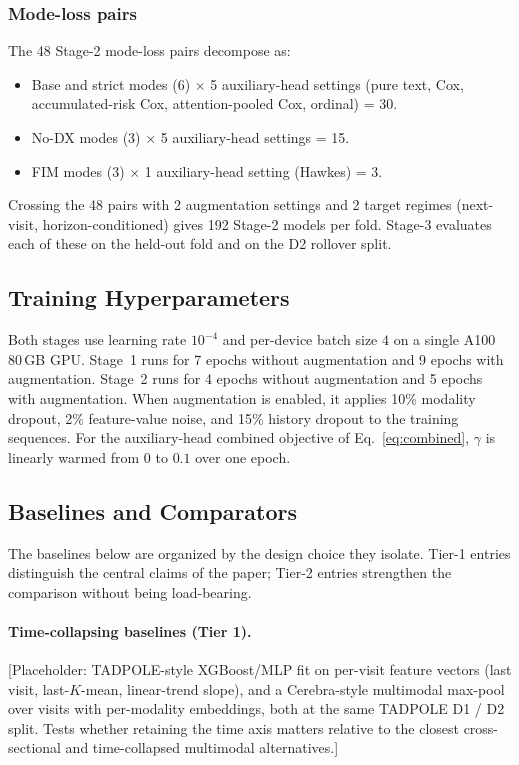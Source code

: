 \documentclass{article}
\begin{document}
\subsubsection{Mode-loss pairs}

The 48 Stage-2 mode-loss pairs decompose as:
\begin{itemize}[leftmargin=*,itemsep=2pt,topsep=2pt]
    \item Base and strict modes (6) $\times$ 5 auxiliary-head settings (pure text, Cox, accumulated-risk Cox, attention-pooled Cox, ordinal) = 30.
    \item No-DX modes (3) $\times$ 5 auxiliary-head settings = 15.
    \item FIM modes (3) $\times$ 1 auxiliary-head setting (Hawkes) = 3.
\end{itemize}
Crossing the 48 pairs with 2 augmentation settings and 2 target regimes (next-visit, horizon-conditioned) gives 192 Stage-2 models per fold. Stage-3 evaluates each of these on the held-out fold and on the D2 rollover split.

\subsection{Training Hyperparameters}
\label{app:hparams}

Both stages use learning rate $10^{-4}$ and per-device batch size $4$ on a single A100 80\,GB GPU. Stage~1 runs for 7 epochs without augmentation and 9 epochs with augmentation. Stage~2 runs for 4 epochs without augmentation and 5 epochs with augmentation. When augmentation is enabled, it applies 10\% modality dropout, 2\% feature-value noise, and 15\% history dropout to the training sequences. For the auxiliary-head combined objective of Eq.~\eqref{eq:combined}, $\gamma$ is linearly warmed from $0$ to $0.1$ over one epoch.

\subsection{Baselines and Comparators}
\label{app:baselines}

The baselines below are organized by the design choice they isolate. Tier-1 entries distinguish the central claims of the paper; Tier-2 entries strengthen the comparison without being load-bearing.

\paragraph{Time-collapsing baselines (Tier 1).}
[Placeholder: TADPOLE-style XGBoost/MLP fit on per-visit feature vectors (last visit, last-$K$-mean, linear-trend slope), and a Cerebra-style multimodal max-pool over visits with per-modality embeddings, both at the same TADPOLE D1 / D2 split. Tests whether retaining the time axis matters relative to the closest cross-sectional and time-collapsed multimodal alternatives.]
\end{document}
